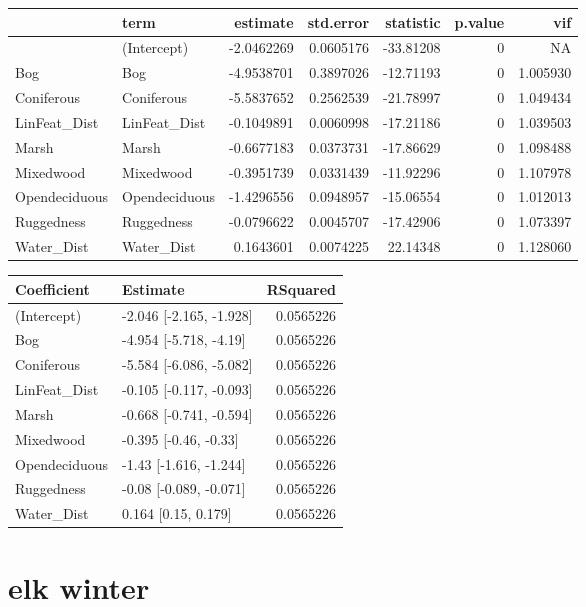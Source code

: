 \documentclass[]{article}
\begin{document}
\begin{tabular}{llrrrrr}
\toprule
  & term & estimate & std.error & statistic & p.value & vif\\
\midrule
 & (Intercept) & -2.0462269 & 0.0605176 & -33.81208 & 0 & NA\\
Bog & Bog & -4.9538701 & 0.3897026 & -12.71193 & 0 & 1.005930\\
Coniferous & Coniferous & -5.5837652 & 0.2562539 & -21.78997 & 0 & 1.049434\\
LinFeat\_Dist & LinFeat\_Dist & -0.1049891 & 0.0060998 & -17.21186 & 0 & 1.039503\\
Marsh & Marsh & -0.6677183 & 0.0373731 & -17.86629 & 0 & 1.098488\\
Mixedwood & Mixedwood & -0.3951739 & 0.0331439 & -11.92296 & 0 & 1.107978\\
Opendeciduous & Opendeciduous & -1.4296556 & 0.0948957 & -15.06554 & 0 & 1.012013\\
Ruggedness & Ruggedness & -0.0796622 & 0.0045707 & -17.42906 & 0 & 1.073397\\
Water\_Dist & Water\_Dist & 0.1643601 & 0.0074225 & 22.14348 & 0 & 1.128060\\
\bottomrule
\end{tabular}

\begin{tabular}{llr}
\toprule
Coefficient & Estimate & RSquared\\
\midrule
(Intercept) & -2.046 [-2.165, -1.928] & 0.0565226\\
Bog & -4.954 [-5.718, -4.19] & 0.0565226\\
Coniferous & -5.584 [-6.086, -5.082] & 0.0565226\\
LinFeat\_Dist & -0.105 [-0.117, -0.093] & 0.0565226\\
Marsh & -0.668 [-0.741, -0.594] & 0.0565226\\
Mixedwood & -0.395 [-0.46, -0.33] & 0.0565226\\
Opendeciduous & -1.43 [-1.616, -1.244] & 0.0565226\\
Ruggedness & -0.08 [-0.089, -0.071] & 0.0565226\\
Water\_Dist & 0.164 [0.15, 0.179] & 0.0565226\\
\bottomrule
\end{tabular}

\section{elk winter}\label{elk-winter}
\end{document}
